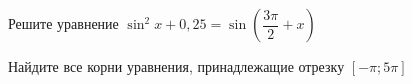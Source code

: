 \begin{ex}
	\begin{condition}
		\begin{enumcols}[label=\asbuk*)]
			\item Решите уравнение \( \sin^2 x +0,25 = \sin{\left(\dfrac{3\pi}{2} + x\right)} \)
			\item Найдите все корни уравнения, принадлежащие отрезку \( \left[-\pi;5\pi\right] \)
		\end{enumcols}
	\end{condition}
\end{ex}